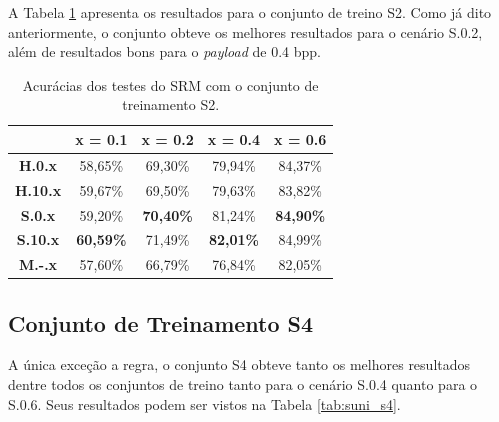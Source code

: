 A Tabela \ref{tab:suni_s2} apresenta os resultados para o conjunto de treino S2. Como já dito anteriormente, o conjunto obteve os melhores resultados para o cenário S.0.2, além de resultados bons para o \textit{payload} de 0.4 bpp.
\begin{table}[!htb]
\centering
\begin{tabular}{c|c|c|c|c|}
\cline{2-5}
\textbf{}                             & \textbf{x = 0.1} & \textbf{x = 0.2} & \textbf{x = 0.4} & \textbf{x = 0.6} \\ \hline
\multicolumn{1}{|c|}{\textbf{H.0.x}}  & 58,65\%          & 69,30\%          & 79,94\%          & 84,37\%          \\ \hline
\multicolumn{1}{|c|}{\textbf{H.10.x}} & 59,67\% & 69,50\% & 79,63\% & 83,82\% \\ \hline
\multicolumn{1}{|c|}{\textbf{S.0.x}}  & 59,20\%          & \textbf{70,40\%}          & 81,24\%         & \textbf{84,90\%}          \\ \hline
\multicolumn{1}{|c|}{\textbf{S.10.x}} & \textbf{60,59\%}          & 71,49\%
& \textbf{82,01\%}          & 84,99\%          \\ \hline
\multicolumn{1}{|c|}{\textbf{M.-.x}}  & 57,60\%          & 66,79\%          & 76,84\%          & 82,05\%          \\ \hline
\end{tabular}
\caption{Acurácias dos testes do SRM com o conjunto de treinamento S2.}
\label{tab:suni_s2}

\end{table}



\subsection{Conjunto de Treinamento S4}

A única exceção a regra, o conjunto S4 obteve tanto os melhores resultados dentre todos os conjuntos de treino tanto para o cenário S.0.4 quanto para o S.0.6. Seus resultados podem ser vistos na Tabela \ref{tab:suni_s4}.

